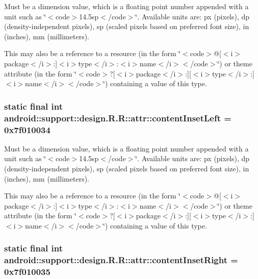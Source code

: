 Must be a dimension value, which is a floating point number appended with a unit such as \char`\"{}$<$code$>$14.5sp$<$/code$>$\char`\"{}. Available units are: px (pixels), dp (density-independent pixels), sp (scaled pixels based on preferred font size), in (inches), mm (millimeters). 

This may also be a reference to a resource (in the form \char`\"{}$<$code$>$@\mbox{[}$<$i$>$package$<$/i$>$:\mbox{]}$<$i$>$type$<$/i$>$:$<$i$>$name$<$/i$>$$<$/code$>$\char`\"{}) or theme attribute (in the form \char`\"{}$<$code$>$?\mbox{[}$<$i$>$package$<$/i$>$:\mbox{]}\mbox{[}$<$i$>$type$<$/i$>$:\mbox{]}$<$i$>$name$<$/i$>$$<$/code$>$\char`\"{}) containing a value of this type. \hypertarget{classandroid_1_1support_1_1design_1_1_r_1_1attr_4e6d46f4acc1e8dd2167488ef9c06268}{
\subsubsection[{contentInsetLeft}]{\setlength{\rightskip}{0pt plus 5cm}static final int android::support::design.R.R::attr::contentInsetLeft = 0x7f010034}}
\label{classandroid_1_1support_1_1design_1_1_r_1_1attr_4e6d46f4acc1e8dd2167488ef9c06268}


Must be a dimension value, which is a floating point number appended with a unit such as \char`\"{}$<$code$>$14.5sp$<$/code$>$\char`\"{}. Available units are: px (pixels), dp (density-independent pixels), sp (scaled pixels based on preferred font size), in (inches), mm (millimeters). 

This may also be a reference to a resource (in the form \char`\"{}$<$code$>$@\mbox{[}$<$i$>$package$<$/i$>$:\mbox{]}$<$i$>$type$<$/i$>$:$<$i$>$name$<$/i$>$$<$/code$>$\char`\"{}) or theme attribute (in the form \char`\"{}$<$code$>$?\mbox{[}$<$i$>$package$<$/i$>$:\mbox{]}\mbox{[}$<$i$>$type$<$/i$>$:\mbox{]}$<$i$>$name$<$/i$>$$<$/code$>$\char`\"{}) containing a value of this type. \hypertarget{classandroid_1_1support_1_1design_1_1_r_1_1attr_1725a946008b20eb5098c94cfb83b80d}{
\subsubsection[{contentInsetRight}]{\setlength{\rightskip}{0pt plus 5cm}static final int android::support::design.R.R::attr::contentInsetRight = 0x7f010035}}
\label{classandroid_1_1support_1_1design_1_1_r_1_1attr_1725a946008b20eb5098c94cfb83b80d}


